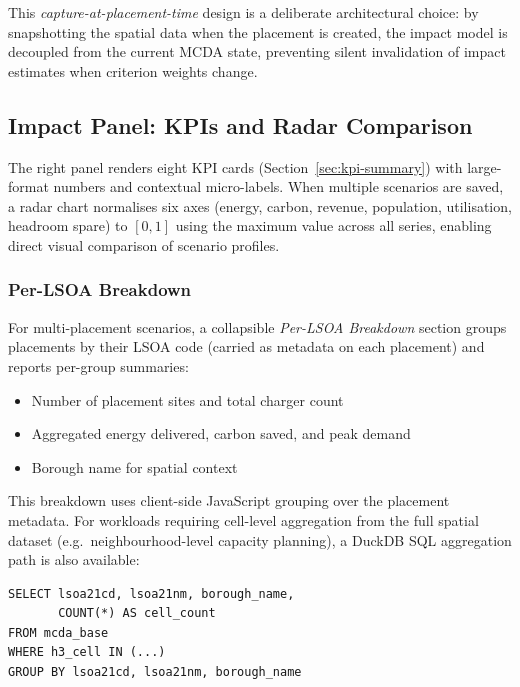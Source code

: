 \noindent This \emph{capture-at-placement-time} design is a deliberate architectural choice: by snapshotting the spatial data when the placement is created, the impact model is decoupled from the current MCDA state, preventing silent invalidation of impact estimates when criterion weights change.

\subsection{Impact Panel: KPIs and Radar Comparison}
\label{sec:impact-panel}

The right panel renders eight KPI cards (Section~\ref{sec:kpi-summary}) with large-format numbers and contextual micro-labels. When multiple scenarios are saved, a radar chart normalises six axes (energy, carbon, revenue, population, utilisation, headroom spare) to $[0, 1]$ using the maximum value across all series, enabling direct visual comparison of scenario profiles.

\subsubsection{Per-LSOA Breakdown}
\label{sec:lsoa-breakdown}

For multi-placement scenarios, a collapsible \emph{Per-LSOA Breakdown} section groups placements by their LSOA code (carried as metadata on each placement) and reports per-group summaries:

\begin{itemize}[nosep]
    \item Number of placement sites and total charger count
    \item Aggregated energy delivered, carbon saved, and peak demand
    \item Borough name for spatial context
\end{itemize}

\noindent This breakdown uses client-side JavaScript grouping over the placement metadata. For workloads requiring cell-level aggregation from the full spatial dataset (e.g.\ neighbourhood-level capacity planning), a DuckDB SQL aggregation path is also available:

\begin{verbatim}
SELECT lsoa21cd, lsoa21nm, borough_name,
       COUNT(*) AS cell_count
FROM mcda_base
WHERE h3_cell IN (...)
GROUP BY lsoa21cd, lsoa21nm, borough_name
\end{verbatim}

